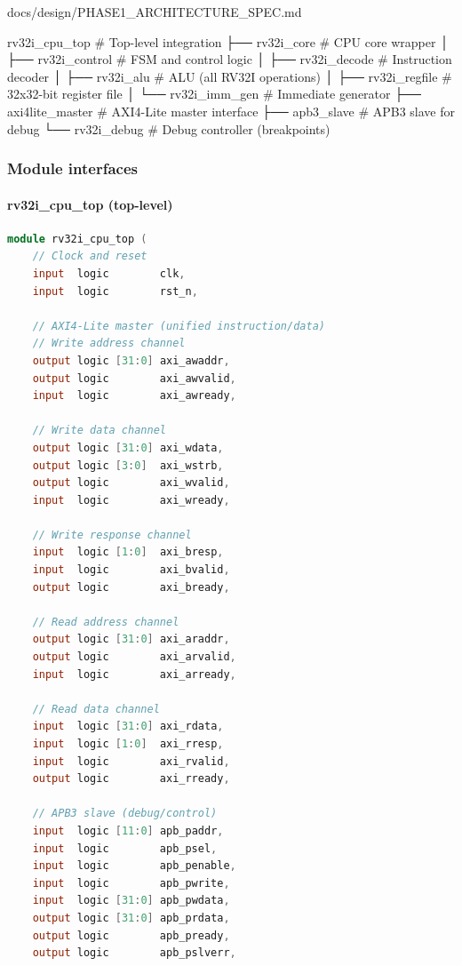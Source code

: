 \begin{relocated}{docs/design/PHASE1_ARCHITECTURE_SPEC.md}
\begin{textblock}
rv32i_cpu_top              # Top-level integration
├── rv32i_core             # CPU core wrapper
│   ├── rv32i_control      # FSM and control logic
│   ├── rv32i_decode       # Instruction decoder
│   ├── rv32i_alu          # ALU (all RV32I operations)
│   ├── rv32i_regfile      # 32x32-bit register file
│   └── rv32i_imm_gen      # Immediate generator
├── axi4lite_master        # AXI4-Lite master interface
├── apb3_slave             # APB3 slave for debug
└── rv32i_debug            # Debug controller (breakpoints)
\end{textblock}

\subsubsection{Module interfaces}\label{ds:ch:phase1-architecture:module-interfaces}

\paragraph{\texorpdfstring{rv32i\_\allowbreak{}cpu\_\allowbreak{}top
(top-level)}{rv32i\_cpu\_top (top-level)}}\label{ds:ch:phase1-architecture:rv32i-cpu-top-top-level}

\begin{lstlisting}[language=Verilog]
module rv32i_cpu_top (
    // Clock and reset
    input  logic        clk,
    input  logic        rst_n,

    // AXI4-Lite master (unified instruction/data)
    // Write address channel
    output logic [31:0] axi_awaddr,
    output logic        axi_awvalid,
    input  logic        axi_awready,

    // Write data channel
    output logic [31:0] axi_wdata,
    output logic [3:0]  axi_wstrb,
    output logic        axi_wvalid,
    input  logic        axi_wready,

    // Write response channel
    input  logic [1:0]  axi_bresp,
    input  logic        axi_bvalid,
    output logic        axi_bready,

    // Read address channel
    output logic [31:0] axi_araddr,
    output logic        axi_arvalid,
    input  logic        axi_arready,

    // Read data channel
    input  logic [31:0] axi_rdata,
    input  logic [1:0]  axi_rresp,
    input  logic        axi_rvalid,
    output logic        axi_rready,

    // APB3 slave (debug/control)
    input  logic [11:0] apb_paddr,
    input  logic        apb_psel,
    input  logic        apb_penable,
    input  logic        apb_pwrite,
    input  logic [31:0] apb_pwdata,
    output logic [31:0] apb_prdata,
    output logic        apb_pready,
    output logic        apb_pslverr,


\end{lstlisting}
\end{relocated}

